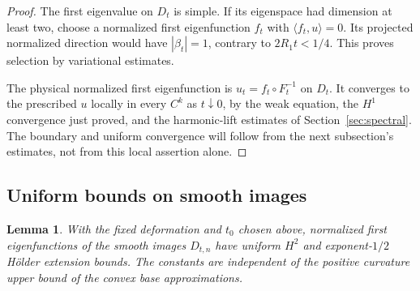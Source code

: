 \documentclass[11pt]{article}
\newtheorem{lemma}[theorem]{Lemma}
\theoremstyle{definition}
\theoremstyle{remark}
\numberwithin{equation}{section}
\begin{document}
\begin{proof}
The first eigenvalue on $D_t$ is simple. If its eigenspace had dimension at least two, choose a normalized first eigenfunction $f_t$ with $\langle f_t,u\rangle=0$. Its projected normalized direction would have $|\beta_t|=1$, contrary to $2R_1t<1/4$. This proves selection by variational estimates.

The physical normalized first eigenfunction is $u_t=f_t\circ F_t^{-1}$ on $D_t$. It converges to the prescribed $u$ locally in every $C^k$ as $t\downarrow0$, by the weak equation, the $H^1$ convergence just proved, and the harmonic-lift estimates of Section~\ref{sec:spectral}. The boundary and uniform convergence will follow from the next subsection's estimates, not from this local assertion alone.

\end{proof}
\subsection{Uniform bounds on smooth images}\label{subsec:11.3}
\begin{lemma}\label{lem:image-bounds}
With the fixed deformation and $t_0$ chosen above, normalized first eigenfunctions of the smooth images $D_{t,n}$ have uniform $H^2$ and exponent-$1/2$ H\"older extension bounds. The constants are independent of the positive curvature upper bound of the convex base approximations.
\end{lemma}
\end{document}
